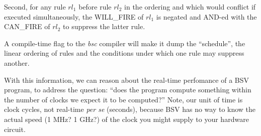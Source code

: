 Second, for any rule $rl_1$ before rule $rl_2$ in the ordering and
which would conflict if executed simultaneously, the WILL\_FIRE of
$rl_1$ is negated and AND-ed with the CAN\_FIRE of $rl_2$ to suppress
the latter rule.

A compile-time flag to the \emph{bsc} compiler will make it dump the
``schedule'', {\ie} the linear ordering of rules and the conditions
under which one rule may suppress another.

With this information, we can reason about the real-time perfomance of
a BSV program, {\ie} to address the question: ``does the program
compute something within the number of clocks we expect it to be
computed?''  Note, our unit of time is clock cycles, not real-time
\emph{per se} (seconds), because BSV has no way to know the actual
speed (1 MHz?  1 GHz?) of the clock you might supply to your hardware
circuit.

